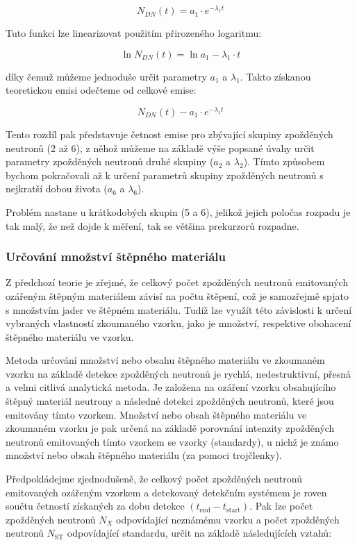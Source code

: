 \[
N_{DN}(t) = a_1 \cdot e^{-\lambda_1 t}
\]

Tuto funkci lze linearizovat použitím přirozeného logaritmu:

\[
\ln N_{DN}(t) = \ln a_1 - \lambda_1 \cdot t
\]

díky čemuž můžeme jednoduše určit parametry $a_1$ a $\lambda_1$. Takto získanou teoretickou emisi odečteme od celkové emise:

\[
N_{DN}(t) - a_1 \cdot e^{-\lambda_1 t}
\]

Tento rozdíl pak představuje četnost emise pro zbývající skupiny zpožděných neutronů (2 až 6), z něhož můžeme na základě výše popsané úvahy určit parametry zpožděných neutronů druhé skupiny ($a_2$ a $\lambda_2$). Tímto způsobem bychom pokračovali až k určení parametrů skupiny zpožděných neutronů s nejkratší dobou života ($a_6$ a $\lambda_6$).

Problém nastane u krátkodobých skupin (5 a 6), jelikož jejich poločas rozpadu je tak malý, že než dojde k měření, tak se většina prekurzorů rozpadne.

\subsubsection{Určování množství štěpného materiálu}

Z předchozí teorie je zřejmé, že celkový počet zpožděných neutronů emitovaných ozářeným štěpným materiálem závisí na počtu štěpení, což je samozřejmě spjato s množstvím jader ve štěpném materiálu. Tudíž lze využít této závislosti k určení vybraných vlastností zkoumaného vzorku, jako je množství, respektive obohacení štěpného materiálu ve vzorku.

Metoda určování množství nebo obsahu štěpného materiálu ve zkoumaném vzorku na základě detekce zpožděných neutronů je rychlá, nedestruktivní, přesná a velmi citlivá analytická metoda. Je založena na ozáření vzorku obsahujícího štěpný materiál neutrony a následné detekci zpožděných neutronů, které jsou emitovány tímto vzorkem. Množství nebo obsah štěpného materiálu ve zkoumaném vzorku je pak určená na základě porovnání intenzity zpožděných neutronů emitovaných tímto vzorkem se vzorky (standardy), u nichž je známo množství nebo obsah štěpného materiálu (za pomoci trojčlenky).

Předpokládejme zjednodušeně, že celkový počet zpožděných neutronů emitovaných ozářeným vzorkem a detekovaný detekčním systémem je roven součtu četností získaných za dobu detekce $(t_\text{end} - t_\text{start})$. Pak lze počet zpožděných neutronů $N_X$ odpovídající neznámému vzorku a počet zpožděných neutronů $N_\text{ST}$ odpovídající standardu, určit na základě následujících vztahů:

